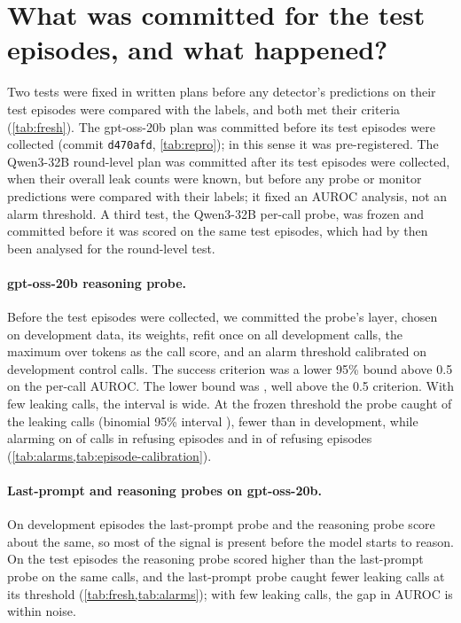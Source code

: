 \section{What was committed for the test episodes, and what happened?}
\label{app:confirmation}

Two tests were fixed in written plans before any detector's predictions on their test episodes were compared with the labels, and both met their criteria (\cref{tab:fresh}).
The gpt-oss-20b plan was committed before its test episodes were collected (commit \texttt{d470afd}, \cref{tab:repro}); in this sense it was pre-registered.
The Qwen3-32B round-level plan was committed after its test episodes were collected, when their overall leak counts were known, but before any probe or monitor predictions were compared with their labels; it fixed an AUROC analysis, not an alarm threshold.
A third test, the Qwen3-32B per-call probe, was frozen and committed before it was scored on the same test episodes, which had by then been analysed for the round-level test.

\paragraph{gpt-oss-20b reasoning probe.}
Before the test episodes were collected, we committed the probe's layer, chosen on development data, its weights, refit once on all development calls, the maximum over tokens as the call score, and an alarm threshold calibrated on development control calls.
The success criterion was a lower 95\% bound above 0.5 on the per-call AUROC.
The lower bound was \gptossFreshReasoningLow{}, well above the 0.5 criterion.
With few leaking calls, the interval is wide.
At the frozen threshold the probe caught \gptossFreshCaught{} of the leaking calls (binomial 95\% interval \gptossFreshCaughtCI{}), fewer than in development, while alarming on \gptFreshAlarmOne{} of calls in refusing episodes and in \gptossFreshRefusingEpisodeAlarm{} of refusing episodes (\cref{tab:alarms,tab:episode-calibration}).

\paragraph{Last-prompt and reasoning probes on gpt-oss-20b.}
On development episodes the last-prompt probe and the reasoning probe score about the same, so most of the signal is present before the model starts to reason.
On the test episodes the reasoning probe scored higher than the last-prompt probe on the same calls, and the last-prompt probe caught fewer leaking calls at its threshold (\cref{tab:fresh,tab:alarms}); with few leaking calls, the gap in AUROC is within noise.


